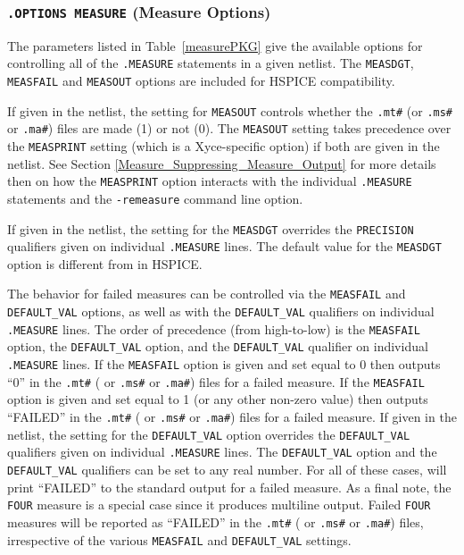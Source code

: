 

\subsubsection{\texttt{.OPTIONS MEASURE} (Measure Options)}
The parameters listed in Table~\ref{measurePKG} give the available
options for controlling all of the \texttt{.MEASURE} statements in
a given \Xyce{} netlist.  The \texttt{MEASDGT}, \texttt{MEASFAIL}
and \texttt{MEASOUT} options are included for HSPICE compatibility.

If given in the netlist, the setting for \texttt{MEASOUT} controls whether 
the \texttt{.mt\#} (or \texttt{.ms\#} or \texttt{.ma\#}) files are made (1) or not (0). 
The \texttt{MEASOUT} setting takes precedence over the \texttt{MEASPRINT} setting 
(which is a Xyce-specific option) if both are given in the netlist.
See Section \ref{Measure_Suppressing_Measure_Output} for more details then on 
how the \texttt{MEASPRINT} option interacts with the individual 
\texttt {.MEASURE} statements and the \texttt{-remeasure} command 
line option.

If given in the netlist, the setting for the \texttt{MEASDGT} overrides the 
\texttt{PRECISION} qualifiers given on individual \texttt{.MEASURE} lines. 
The default value for the \texttt{MEASDGT} option is different from in HSPICE.

The \Xyce{} behavior for failed measures can be controlled via the \texttt{MEASFAIL}
and \texttt{DEFAULT\_VAL} options, as well as with the \texttt{DEFAULT\_VAL} 
qualifiers on individual \texttt{.MEASURE} lines.  The order of precedence (from 
high-to-low) is the \texttt{MEASFAIL} option, the \texttt{DEFAULT\_VAL} option, 
and the \texttt{DEFAULT\_VAL} qualifier on individual \texttt{.MEASURE} lines.  
If the \texttt{MEASFAIL} option is given and set equal to 0 then \Xyce{} outputs 
``0'' in the \texttt{.mt\#} ( or \texttt{.ms\#} or \texttt{.ma\#}) files for a failed measure.  
If the \texttt{MEASFAIL} option is given and set equal to 1 (or any other non-zero 
value) then \Xyce{} outputs ``FAILED'' in the \texttt{.mt\#} ( or \texttt{.ms\#} or \texttt{.ma\#}) 
files for a failed measure.  If given in the netlist, the setting for the 
\texttt{DEFAULT\_VAL} option overrides the \texttt{DEFAULT\_VAL} qualifiers given 
on individual \texttt{.MEASURE} lines.  The \texttt{DEFAULT\_VAL} option and the 
\texttt{DEFAULT\_VAL} qualifiers can be set to any real number.  For all of these 
cases, \Xyce{} will print ``FAILED'' to the standard output for a failed measure.
As a final note, the \texttt{FOUR} measure is a special case since it produces multiline
output.  Failed \texttt{FOUR} measures will be reported as ``FAILED'' in the
\texttt{.mt\#} ( or \texttt{.ms\#} or \texttt{.ma\#}) files, irrespective of the various
\texttt{MEASFAIL} and \texttt{DEFAULT\_VAL} settings.


